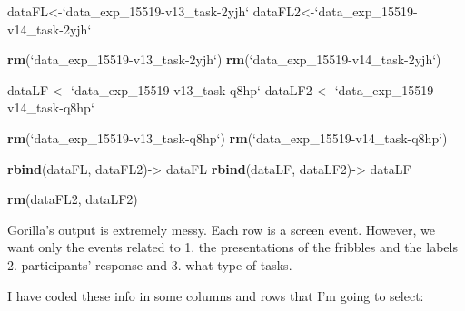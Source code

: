 \documentclass[
]{article}
\newenvironment{Shaded}{\begin{snugshade}}{\end{snugshade}}
\newcommand{\DataTypeTok}[1]{\textcolor[rgb]{0.13,0.29,0.53}{#1}}
\newcommand{\KeywordTok}[1]{\textcolor[rgb]{0.13,0.29,0.53}{\textbf{#1}}}
\newcommand{\NormalTok}[1]{#1}
\newcommand{\StringTok}[1]{\textcolor[rgb]{0.31,0.60,0.02}{#1}}
\begin{document}
\begin{Shaded}
\begin{Highlighting}[]
\NormalTok{dataFL<-}\StringTok{`}\DataTypeTok{data_exp_15519-v13_task-2yjh}\StringTok{`}
\NormalTok{dataFL2<-}\StringTok{`}\DataTypeTok{data_exp_15519-v14_task-2yjh}\StringTok{`}

\KeywordTok{rm}\NormalTok{(}\StringTok{`}\DataTypeTok{data_exp_15519-v13_task-2yjh}\StringTok{`}\NormalTok{)}
\KeywordTok{rm}\NormalTok{(}\StringTok{`}\DataTypeTok{data_exp_15519-v14_task-2yjh}\StringTok{`}\NormalTok{)}

\NormalTok{dataLF <-}\StringTok{ `}\DataTypeTok{data_exp_15519-v13_task-q8hp}\StringTok{`}
\NormalTok{dataLF2 <-}\StringTok{ `}\DataTypeTok{data_exp_15519-v14_task-q8hp}\StringTok{`}

\KeywordTok{rm}\NormalTok{(}\StringTok{`}\DataTypeTok{data_exp_15519-v13_task-q8hp}\StringTok{`}\NormalTok{)}
\KeywordTok{rm}\NormalTok{(}\StringTok{`}\DataTypeTok{data_exp_15519-v14_task-q8hp}\StringTok{`}\NormalTok{)}
\end{Highlighting}
\end{Shaded}

\begin{Shaded}
\begin{Highlighting}[]
\KeywordTok{rbind}\NormalTok{(dataFL, dataFL2)->}\StringTok{ }\NormalTok{dataFL}
\KeywordTok{rbind}\NormalTok{(dataLF, dataLF2)->}\StringTok{ }\NormalTok{dataLF}

\KeywordTok{rm}\NormalTok{(dataFL2, dataLF2)}
\end{Highlighting}
\end{Shaded}

Gorilla's output is extremely messy. Each row is a screen event.
However, we want only the events related to 1. the presentations of the
fribbles and the labels 2. participants' response and 3. what type of
tasks.

I have coded these info in some columns and rows that I'm going to
select:
\end{document}
